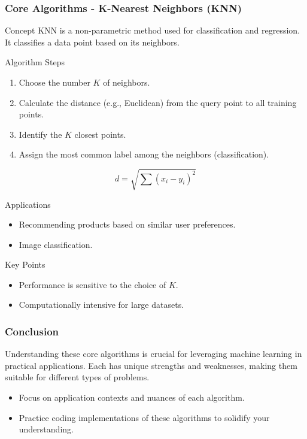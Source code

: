 \documentclass[aspectratio=169]{beamer}
\begin{document}
\begin{frame}[fragile]
    \frametitle{Core Algorithms - K-Nearest Neighbors (KNN)}
    \begin{block}{Concept}
        KNN is a non-parametric method used for classification and regression. It classifies a data point based on its neighbors.
    \end{block}
    
    \begin{block}{Algorithm Steps}
        \begin{enumerate}
            \item Choose the number $K$ of neighbors.
            \item Calculate the distance (e.g., Euclidean) from the query point to all training points.
            \item Identify the $K$ closest points.
            \item Assign the most common label among the neighbors (classification).
        \end{enumerate}
    \end{block}

    \begin{equation}
        d = \sqrt{\sum (x_i - y_i)^2}
    \end{equation}

    \begin{block}{Applications}
        \begin{itemize}
            \item Recommending products based on similar user preferences.
            \item Image classification.
        \end{itemize}
    \end{block}

    \begin{block}{Key Points}
        \begin{itemize}
            \item Performance is sensitive to the choice of $K$.
            \item Computationally intensive for large datasets.
        \end{itemize}
    \end{block}
\end{frame}

\begin{frame}[fragile]
    \frametitle{Conclusion}
    Understanding these core algorithms is crucial for leveraging machine learning in practical applications. Each has unique strengths and weaknesses, making them suitable for different types of problems. 
    \begin{itemize}
        \item Focus on application contexts and nuances of each algorithm.
        \item Practice coding implementations of these algorithms to solidify your understanding.
    \end{itemize}
\end{frame}
\end{document}
